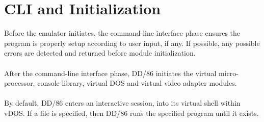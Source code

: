 \chapter{CLI and Initialization}

Before the emulator initiates, the command-line interface phase ensures the program is
properly setup according to user input, if any. If possible, any possible errors are detected
and returned before module initialization.
\\\\
After the command-line interface phase, DD/86 initiates the virtual micro-processor,
console library, virtual DOS and virtual video adapter modules.
\\\\
By default, DD/86 enters an interactive session, into its virtual shell within vDOS. If a file is
specified, then DD/86 runs the specified program until it exists.